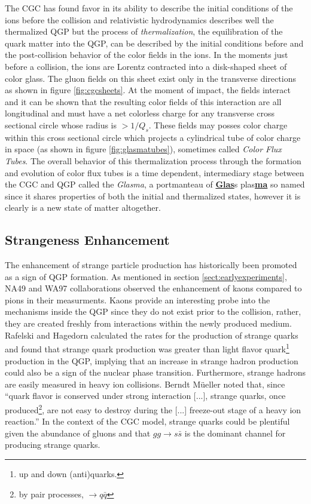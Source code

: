 The CGC has found favor in its ability to describe the initial conditions of the ions before the collision and relativistic hydrodynamics describes well the thermalized QGP but the process of \textit{thermalization}, the equilibration of the quark matter into the QGP, can be described by the initial conditions before and the post-collision behavior of the color fields in the ions\citep{Fujii:2008dd}. In the moments just before a collision, the ions are Lorentz contracted into a disk-shaped sheet of color glass. The gluon fields on this sheet exist only in the transverse directions as shown in figure \ref{fig:cgcsheets}. At the moment of impact, the fields interact and it can be shown\citep{Fries:2006pv} that the resulting color fields of this interaction are all longitudinal and must have a net colorless charge for any transverse cross sectional circle whose radius is $> 1/Q_s$. These fields may posses color charge within this cross sectional circle which projects a cylindrical tube of color charge in space (as shown in figure \ref{fig:glasmatubes}), sometimes called \textit{Color Flux Tubes}. The overall behavior of this thermalization process through the formation and evolution of color flux tubes is a time dependent, intermediary stage between the CGC and QGP called the \textit{Glasma}, a portmanteau of \underline{\textbf{Glas}}s plas\underline{\textbf{ma}} so named since it shares properties of both the initial and thermalized states, however it is clearly is a new state of matter altogether.

\subsection{Strangeness Enhancement}
The enhancement of strange particle production has historically been promoted as a sign of QGP formation. As mentioned in section \ref{sect:earlyexperiments}, NA49 and WA97 collaborations observed the enhancement of kaons compared to pions in their measurments. Kaons provide an interesting probe into the mechanisms inside the QGP since they do not exist prior to the collision, rather, they are created freshly from interactions within the newly produced medium. Rafelski and Hagedorn calculated the rates for the production of strange quarks\citep{statmechofquarks} and found that strange quark production was greater than light flavor quark\footnote{up and down (anti)quarks.} production in the QGP, implying that an increase in strange hadron production could also be a sign of the nuclear phase transition. Furthermore, strange hadrons are easily measured in heavy ion collisions. Berndt M\"ueller noted that, since ``quark flavor is conserved under strong interaction [...], strange quarks, once produced\footnote{by pair processes, $\rightarrow q\bar{q}$}, are not easy to destroy during the [...] freeze-out stage of a heavy ion reaction.''\citep{Muller:2011tu} In the context of the CGC model, strange quarks could be plentiful given the abundance of gluons and that $gg \rightarrow s \bar{s}$ is the dominant channel for producing strange quarks\citep{PhysRevLett.48.1066}.

